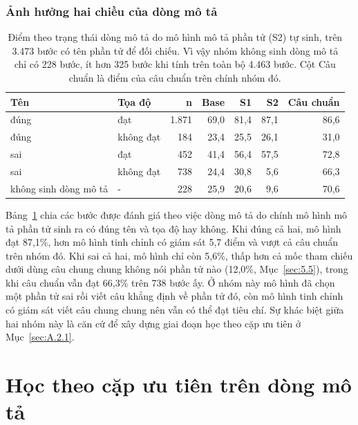 \subsubsection{Ảnh hưởng hai chiều của dòng mô tả}\label{sec:A.1.3.2}

\begin{table}[htbp]
\centering\small
\caption[Điểm theo trạng thái dòng mô tả do mô hình mô tả phần tử (S2) tự sinh.]{Điểm theo trạng thái dòng mô tả do mô hình mô tả phần tử (S2) tự sinh, trên 3.473 bước có tên phần tử để đối chiếu. Vì vậy nhóm không sinh dòng mô tả chỉ có 228 bước, ít hơn 325 bước khi tính trên toàn bộ 4.463 bước. Cột Câu chuẩn là điểm của câu chuẩn trên chính nhóm đó.}\label{tab:A.3}
\setlength{\tabcolsep}{3pt}
\begin{tabular}{@{}llrrrrr@{}}
\toprule
\textbf{Tên} & \textbf{Tọa độ} & \textbf{n} & \textbf{Base} & \textbf{S1} & \textbf{S2} & \textbf{Câu chuẩn} \\
\midrule
đúng & đạt & 1.871 & 69,0 & 81,4 & 87,1 & 86,6 \\
đúng & không đạt & 184 & 23,4 & 25,5 & 26,1 & 31,0 \\
sai & đạt & 452 & 41,4 & 56,4 & 57,5 & 72,8 \\
sai & không đạt & 738 & 24,4 & 30,8 & 5,6 & 66,3 \\
không sinh dòng mô tả & - & 228 & 25,9 & 20,6 & 9,6 & 70,6 \\
\bottomrule
\end{tabular}
\end{table}

Bảng~\ref{tab:A.3} chia các bước được đánh giá theo việc dòng mô tả do chính mô hình mô tả phần tử sinh ra có đúng tên và tọa độ hay không. Khi đúng cả hai, mô hình đạt 87,1\%, hơn mô hình tinh chỉnh có giám sát 5,7 điểm và vượt cả câu chuẩn trên nhóm đó. Khi sai cả hai, mô hình chỉ còn 5,6\%, thấp hơn cả mốc tham chiếu dưới dùng câu chung chung không nói phần tử nào (12,0\%, Mục~\ref{sec:5.5}), trong khi câu chuẩn vẫn đạt 66,3\% trên 738 bước ấy. Ở nhóm này mô hình đã chọn một phần tử sai rồi viết câu khẳng định về phần tử đó, còn mô hình tinh chỉnh có giám sát viết câu chung chung nên vẫn có thể đạt tiêu chí. Sự khác biệt giữa hai nhóm này là căn cứ để xây dựng giai đoạn học theo cặp ưu tiên ở Mục~\ref{sec:A.2.1}.

\section{Học theo cặp ưu tiên trên dòng mô tả}\label{sec:A.2}

